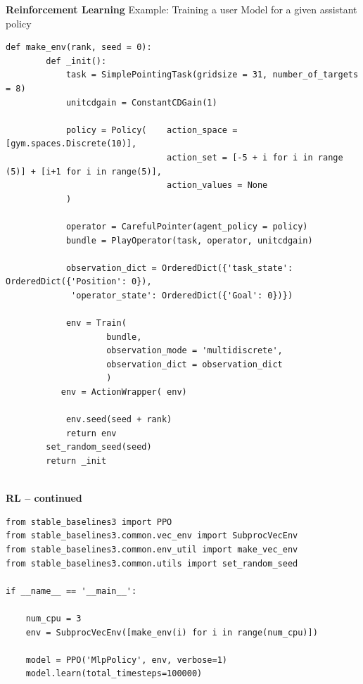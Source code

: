 \documentclass[11pt, xcolor = {dvipsnames}]{beamer}
\begin{document}
\begin{frame}[fragile]{\textbf{Reinforcement Learning}}
Example: Training a user Model for a given assistant policy
\begin{adjustbox}{width=\textwidth}\lstset{language=Python}
\lstset{frame=lines}
\lstset{basicstyle=\footnotesize}
\begin{lstlisting}
def make_env(rank, seed = 0):
        def _init():
            task = SimplePointingTask(gridsize = 31, number_of_targets = 8)
            unitcdgain = ConstantCDGain(1)

            policy = Policy(    action_space = [gym.spaces.Discrete(10)],
                                action_set = [-5 + i for i in range (5)] + [i+1 for i in range(5)],
                                action_values = None
            )

            operator = CarefulPointer(agent_policy = policy)
            bundle = PlayOperator(task, operator, unitcdgain)

            observation_dict = OrderedDict({'task_state': OrderedDict({'Position': 0}),
             'operator_state': OrderedDict({'Goal': 0})})
            
            env = Train(
                    bundle,
                    observation_mode = 'multidiscrete',
                    observation_dict = observation_dict
                    )
           env = ActionWrapper( env)

            env.seed(seed + rank)
            return env
        set_random_seed(seed)
        return _init
        
\end{lstlisting}
\end{adjustbox}
\end{frame}


\begin{frame}[fragile]{\textbf{RL -- continued}}
\begin{adjustbox}{width=\textwidth}
\lstset{language=Python}
\lstset{frame=lines}
\lstset{basicstyle=\footnotesize}
\begin{lstlisting}
from stable_baselines3 import PPO
from stable_baselines3.common.vec_env import SubprocVecEnv
from stable_baselines3.common.env_util import make_vec_env
from stable_baselines3.common.utils import set_random_seed
        
if __name__ == '__main__':

    num_cpu = 3
    env = SubprocVecEnv([make_env(i) for i in range(num_cpu)])

    model = PPO('MlpPolicy', env, verbose=1)
    model.learn(total_timesteps=100000)
\end{lstlisting}
\end{adjustbox}
\end{frame}
\end{document}
